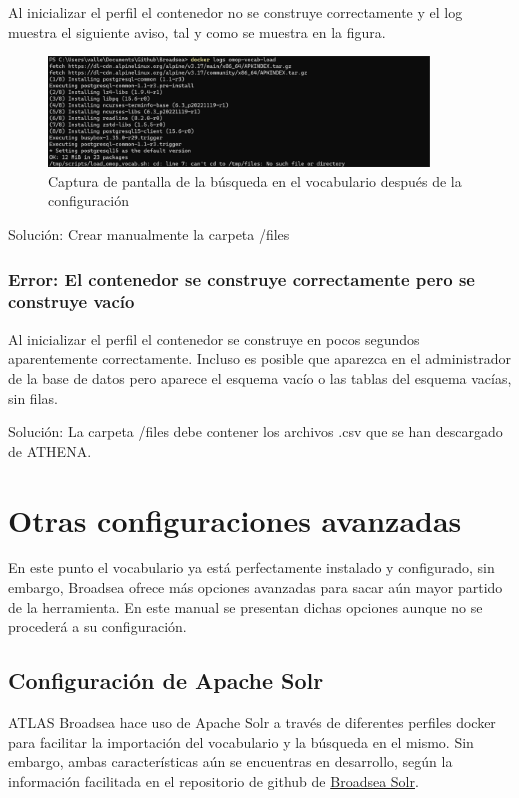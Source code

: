 Al inicializar el perfil  el contenedor no se construye correctamente y el log muestra el siguiente aviso, tal y como se muestra en la figura.

      \begin{figure}[H]
        \centering
        \includegraphics[width=0.90\textwidth]{figures/error05NoFile.png}
        \caption{Captura de pantalla de la búsqueda en el vocabulario después de la configuración}
        \label{fig:error05NoFile}
    \end{figure}
    
Solución: Crear manualmente la carpeta /files

\subsubsection{Error: El contenedor se construye correctamente pero se construye vacío}

Al inicializar el perfil  el contenedor se construye en pocos segundos aparentemente correctamente. Incluso es posible que aparezca en el administrador de la base de datos pero aparece el esquema vacío o las tablas del esquema vacías, sin filas.

Solución: La carpeta /files debe contener los archivos .csv que se han descargado de ATHENA.

\section{Otras configuraciones avanzadas}

En este punto el vocabulario ya está perfectamente instalado y configurado, sin embargo, Broadsea ofrece más opciones avanzadas para sacar aún mayor partido de la herramienta. En este manual se presentan dichas opciones aunque no se procederá a su configuración.

\subsection{Configuración de Apache Solr}

ATLAS Broadsea hace uso de Apache Solr a través de diferentes perfiles docker para facilitar la importación del vocabulario y la búsqueda en el mismo. Sin embargo, ambas características aún se encuentras en desarrollo, según la información facilitada en el repositorio de github de \href{https://github.com/OHDSI/Broadsea-Solr}{Broadsea Solr}.

